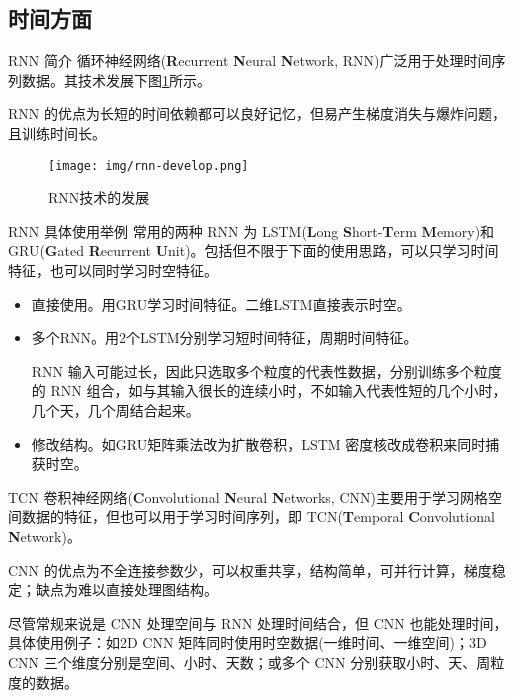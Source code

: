 \documentclass{libs/format}
\begin{document}
\subsection{时间方面}

\begin{frame}{RNN 简介}
  循环神经网络(\textbf{R}ecurrent \textbf{N}eural \textbf{N}etwork, RNN)广泛用于处理时间序列数据。其技术发展下图\ref{fig:rnn-develop}所示。

  RNN 的优点为长短的时间依赖都可以良好记忆，但易产生梯度消失与爆炸问题，且训练时间长。\cite{T-ZS1}
  \begin{figure}
    \centering
    \texttt{[image: img/rnn-develop.png]}
    \caption{RNN技术的发展\cite{T-ZS25}}\label{fig:rnn-develop}
  \end{figure}
\end{frame}

\begin{frame}{RNN 具体使用举例}
  常用的两种 RNN 为 LSTM(\textbf{L}ong \textbf{S}hort-\textbf{T}erm \textbf{M}emory)和GRU(\textbf{G}ated \textbf{R}ecurrent \textbf{U}nit)。包括但不限于下面的使用思路，可以只学习时间特征，也可以同时学习时空特征。
  \begin{itemize}
    \item 直接使用。用GRU学习时间特征\cite{T-36}。二维LSTM直接表示时空\cite{T-46}。
    \item 多个RNN。用2个LSTM分别学习短时间特征，周期时间特征\cite{T-3}。
    
    RNN 输入可能过长，因此只选取多个粒度的代表性数据，分别训练多个粒度的 RNN 组合，如与其输入很长的连续小时，不如输入代表性短的几个小时，几个天，几个周结合起来。\cite{T-ZS1}
    \item 修改结构。如GRU矩阵乘法改为扩散卷积\cite{T-40}，LSTM 密度核改成卷积来同时捕获时空\cite{T-30}。
  \end{itemize}
\end{frame}

\begin{frame}{TCN}
  卷积神经网络(\textbf{C}onvolutional \textbf{N}eural \textbf{N}etworks, CNN)主要用于学习网格空间数据的特征，但也可以用于学习时间序列，即 TCN(\textbf{T}emporal \textbf{C}onvolutional \textbf{N}etwork)。

  CNN 的优点为不全连接参数少，可以权重共享，结构简单，可并行计算，梯度稳定；缺点为难以直接处理图结构。\cite{T-ZS1, T-ZS2}


  尽管常规来说是 CNN 处理空间与 RNN 处理时间结合，但 CNN 也能处理时间，具体使用例子：如2D CNN 矩阵同时使用时空数据(一维时间、一维空间)\cite{T-33}；3D CNN 三个维度分别是空间、小时、天数\cite{T-52}；或多个 CNN 分别获取小时、天、周粒度的数据\cite{T-51}。
\end{frame}
\end{document}
